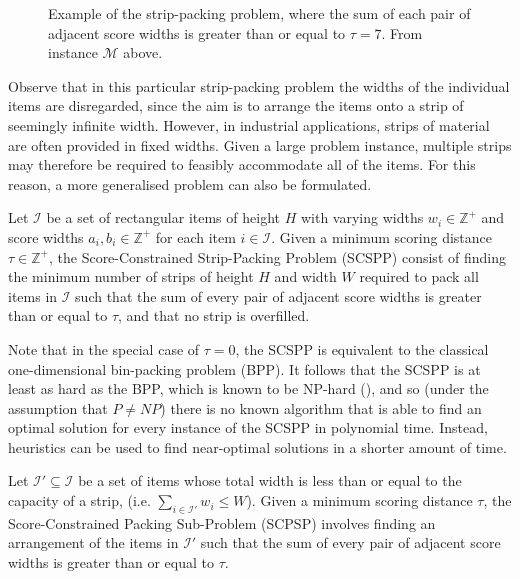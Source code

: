 \documentclass[oribibl]{llncs}
\begin{document}
\begin{figure}	
	\centering
	\begin{subfigure}[h]{0.44\textwidth}
		
		\label{fig:items} \vspace{5pt}
	\end{subfigure} 
	\begin{subfigure}[h]{0.7\textwidth}
		
		\label{fig:itemsaligned}
	\end{subfigure}
	\caption{Example of the strip-packing problem, where the sum of each pair of adjacent score widths is greater than or equal to $\tau = 7$. From instance $\mathcal{M}$ above.}
	\label{fig:items/aligned}
\end{figure}

Observe that in this particular strip-packing problem the widths of the individual items are disregarded, since the aim is to arrange the items onto a strip of seemingly infinite width. However, in industrial applications, strips of material are often provided in fixed widths. Given a large problem instance, multiple strips may therefore be required to feasibly accommodate all of the items. For this reason, a more generalised problem can also be formulated.

\begin{definition}
	Let $\mathcal{I}$ be a set of rectangular items of height $H$ with varying widths $w_i \in \mathbb{Z}^+$ and score widths $a_i, b_i \in \mathbb{Z}^+$ for each item $i \in \mathcal{I}$. Given a minimum scoring distance $\tau \in \mathbb{Z}^+$, the Score-Constrained Strip-Packing Problem (SCSPP) consist of finding the minimum number of strips of height $H$ and width $W$ required to pack all items in $\mathcal{I}$ such that the sum of every pair of adjacent score widths is greater than or equal to $\tau$, and that no strip is overfilled.
\end{definition}

Note that in the special case of $\tau = 0$, the SCSPP is equivalent to the classical one-dimensional bin-packing problem (BPP). It follows that the SCSPP is at least as hard as the BPP, which is known to be NP-hard (\citealp{garey1979}), and so (under the assumption that $P \neq NP$) there is no known algorithm that is able to find an optimal solution for every instance of the SCSPP in polynomial time. Instead, heuristics can be used to find near-optimal solutions in a shorter amount of time.

\begin{definition}
	\label{defn:subprob}
	Let $\mathcal{I}' \subseteq \mathcal{I}$ be a set of items whose total width is less than or equal to the capacity of a strip, (i.e. $\sum_{i\in \mathcal{I}'}w_i \leq W$). Given a minimum scoring distance $\tau$, the Score-Constrained Packing Sub-Problem (SCPSP) involves finding an arrangement of the items in $\mathcal{I}'$ such that the sum of every pair of adjacent score widths is greater than or equal to $\tau$.
\end{definition}
\end{document}
